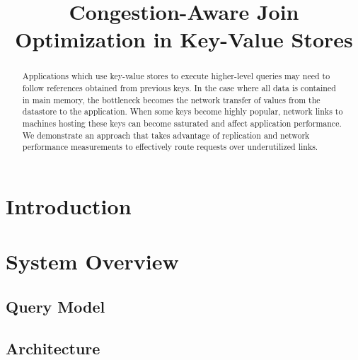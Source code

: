 \documentclass{sig-alternate-2013}
\begin{document}
\hypersetup{pdftitle=Congestion-Aware Join Optimization in Key-Value Stores}

\title{Congestion-Aware Join Optimization in Key-Value Stores}

\author{
}

\maketitle

\begin{abstract}
Applications which use key-value stores to execute higher-level queries may need to follow references obtained from previous keys.
In the case where all data is contained in main memory, the bottleneck becomes the network transfer of values from the datastore to the application.
When some keys become highly popular, network links to machines hosting these keys can become saturated and affect application performance.
We demonstrate an approach that takes advantage of replication and network performance measurements to effectively route requests over underutilized links.
\end{abstract}

\section{Introduction}

\section{System Overview}

\subsection{Query Model}

\subsection{Architecture}
\end{document}
